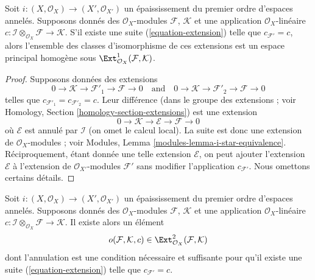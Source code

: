 \begin{lemma}
\label{lemma-inf-ext}
Soit $i : (X, \mathcal{O}_X) \to (X', \mathcal{O}_{X'})$ un épaississement
du premier ordre d'espaces annelés.
Supposons donnés des $\mathcal{O}_X$-modules $\mathcal{F}$, $\mathcal{K}$
et une application $\mathcal{O}_X$-linéaire
$c : \mathcal{I} \otimes_{\mathcal{O}_X} \mathcal{F} \to \mathcal{K}$.
S'il existe une suite (\ref{equation-extension}) telle que
$c_{\mathcal{F}'} = c$, alors l'ensemble des classes d'isomorphisme de ces
extensions est un espace principal homogène sous
$\Ext^1_{\mathcal{O}_X}(\mathcal{F}, \mathcal{K})$.
\end{lemma}

\begin{proof}
Supposons données des extensions
$$
0 \to \mathcal{K} \to \mathcal{F}'_1 \to \mathcal{F} \to 0
\quad\text{and}\quad
0 \to \mathcal{K} \to \mathcal{F}'_2 \to \mathcal{F} \to 0
$$
telles que $c_{\mathcal{F}'_1} = c_{\mathcal{F}'_2} = c$. Leur différence
(dans le groupe des extensions ; voir
Homology, Section \ref{homology-section-extensions})
est une extension
$$
0 \to \mathcal{K} \to \mathcal{E} \to \mathcal{F} \to 0
$$
où $\mathcal{E}$ est annulé par $\mathcal{I}$ (on omet le calcul local).
La suite est donc une extension de $\mathcal{O}_X$-modules ;
voir Modules, Lemma \ref{modules-lemma-i-star-equivalence}.
Réciproquement, étant donnée une telle extension $\mathcal{E}$, on peut ajouter l'extension
$\mathcal{E}$ à l'extension de $\mathcal{O}_{X'}$-modules $\mathcal{F}'$ sans
modifier l'application $c_{\mathcal{F}'}$. Nous omettons certains détails.
\end{proof}

\begin{lemma}
\label{lemma-inf-obs-ext}
Soit $i : (X, \mathcal{O}_X) \to (X', \mathcal{O}_{X'})$
un épaississement du premier ordre d'espaces annelés. Supposons donnés des
$\mathcal{O}_X$-modules $\mathcal{F}$, $\mathcal{K}$
et une application $\mathcal{O}_X$-linéaire
$c : \mathcal{I} \otimes_{\mathcal{O}_X} \mathcal{F} \to \mathcal{K}$.
Il existe alors un élément
$$
o(\mathcal{F}, \mathcal{K}, c) \in
\Ext^2_{\mathcal{O}_X}(\mathcal{F}, \mathcal{K})
$$
dont l'annulation est une condition nécessaire et suffisante pour qu'il existe
une suite (\ref{equation-extension}) telle que $c_{\mathcal{F}'} = c$.
\end{lemma}

